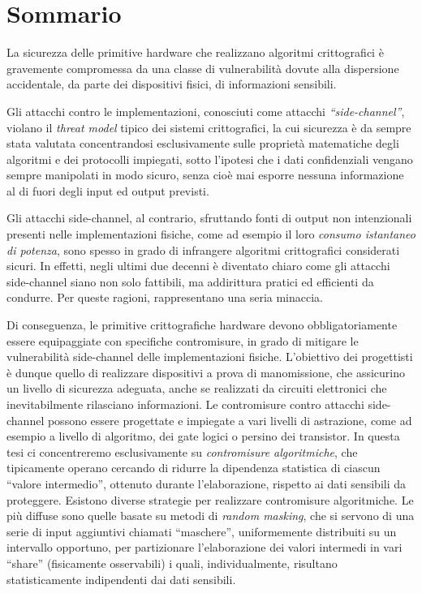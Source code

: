 \newpage
\chapter*{Sommario}


La sicurezza delle primitive hardware che realizzano algoritmi crittografici è gravemente 
compromessa da una classe di vulnerabilità dovute alla dispersione accidentale, da parte dei 
dispositivi fisici, di informazioni sensibili. 

Gli attacchi contro le implementazioni, conosciuti come attacchi \emph{``side-channel''},
violano il \emph{threat model} tipico dei sistemi crittografici, la cui sicurezza è da sempre stata 
valutata concentrandosi esclusivamente sulle proprietà matematiche degli algoritmi e dei 
protocolli impiegati, sotto l'ipotesi che i dati confidenziali vengano sempre manipolati in modo 
sicuro, senza cioè mai esporre nessuna informazione al di fuori degli input ed output previsti.

Gli attacchi side-channel, al contrario, sfruttando fonti di output non intenzionali presenti nelle 
implementazioni fisiche, come ad esempio il loro \emph{consumo istantaneo di potenza}, sono 
spesso in grado di infrangere algoritmi crittografici considerati sicuri.
In effetti, negli ultimi due decenni è diventato chiaro come gli attacchi side-channel siano non 
solo fattibili, ma addirittura pratici ed efficienti da condurre. Per queste ragioni, rappresentano 
una seria minaccia.

Di conseguenza, le primitive crittografiche hardware devono obbligatoriamente essere 
equipaggiate con specifiche contromisure, in grado di mitigare le vulnerabilità side-channel 
delle implementazioni fisiche. 
L'obiettivo dei progettisti è dunque quello di realizzare dispositivi a prova di manomissione, 
che assicurino un livello di sicurezza adeguata, anche se realizzati da circuiti elettronici che 
inevitabilmente rilasciano informazioni. %
Le contromisure contro attacchi side-channel possono essere progettate e impiegate a 
vari livelli di astrazione, come ad esempio a livello di algoritmo, dei gate logici o persino dei 
transistor. 
In questa tesi %
ci concentreremo esclusivamente su \emph{contromisure algoritmiche}, che tipicamente 
operano cercando di ridurre la dipendenza statistica di ciascun ``valore intermedio'', 
ottenuto durante l'elaborazione, %
rispetto ai dati sensibili da proteggere.
Esistono diverse strategie per realizzare contromisure algoritmiche. Le più diffuse sono quelle 
basate su metodi di \emph{random masking}, che si servono di una serie di input aggiuntivi 
chiamati ``maschere'', uniformemente distribuiti su un intervallo opportuno, per partizionare 
l'elaborazione dei valori intermedi %
in vari ``share'' (fisicamente osservabili) i quali, individualmente, risultano statisticamente 
indipendenti dai dati sensibili.

